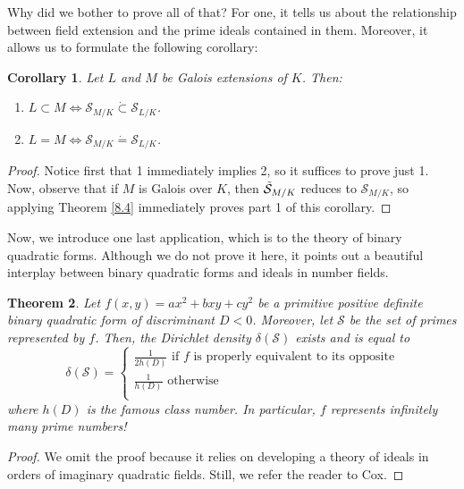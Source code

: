 \documentclass{article}
\theoremstyle{plain}
\newtheorem{thm}{Theorem}
\newtheorem{cor}[thm]{Corollary}
\theoremstyle{definition}
\theoremstyle{remark}
\numberwithin{equation}{section}
\numberwithin{thm}{section}
\begin{document}
Why did we bother to prove all of that? For one, it tells us about the relationship between field extension and the prime ideals contained in them. Moreover, it allows us to formulate the following corollary:

\begin{cor}
Let $L$ and $M$ be Galois extensions of $K$. Then:

\begin{enumerate}

    \item $L \subset M \Longleftrightarrow \mathcal{S}_{M/K} \dot{\subset} \mathcal{S}_{L/K}$.

    \item $L = M \Longleftrightarrow \mathcal{S}_{M/K} \dot{=} \mathcal{S}_{L/K}$.

\end{enumerate}

\end{cor}

\begin{proof}
Notice first that 1 immediately implies 2, so it suffices to prove just 1. Now, observe that if $M$ is Galois over $K$, then $\Tilde{\mathcal{S}}_{M/K}$ reduces to $\mathcal{S}_{M/K}$, so applying Theorem \ref{8.4} immediately proves part 1 of this corollary. 
\end{proof}

Now, we introduce one last application, which is to the theory of binary quadratic forms. Although we do not prove it here, it points out a beautiful interplay between binary quadratic forms and ideals in number fields. 

\begin{thm}
Let $f(x, y) = ax^2 + bxy + cy^2$ be a primitive positive definite binary quadratic form of discriminant $D < 0$. Moreover, let $\mathcal{S}$ be the set of primes represented by $f$. Then, the Dirichlet density $\delta(\mathcal{S})$ exists and is equal to $$\delta(\mathcal{S}) = \begin{cases}
\frac{1}{2h(D)} \text{ if } f \text{ is properly equivalent to its opposite} \\
\frac{1}{h(D)}  \text { otherwise } \\
\end{cases}$$ where $h(D)$ is the famous class number. In particular, $f$ represents infinitely many prime numbers!
\end{thm}

\begin{proof}
We omit the proof because it relies on developing a theory of ideals in orders of imaginary quadratic fields. Still, we refer the reader to Cox\cite{ref_book1}. 
\end{proof}
\end{document}
